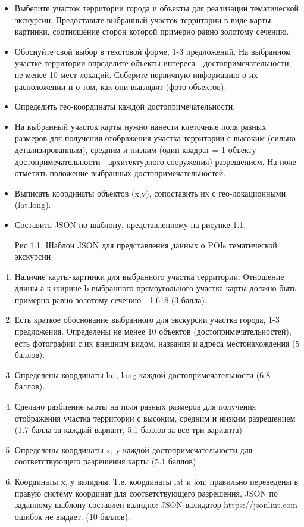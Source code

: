 
\begin{itemize} 
    \item Выберите участок территории города и объекты для реализации тематической экскурсии. Предоставьте выбранный участок территории в виде карты-картинки, соотношение сторон которой примерно равно золотому сечению. 
    \item Обоснуйте свой выбор в текстовой форме, 1-3 предложений. На выбранном участке территории определите объекты интереса - достопримечательности, не менее 10 мест-локаций. Соберите первичную информацию о их расположении и о том, как они выглядят (фото объектов).
    \item Определить гео-координаты каждой достопримечательности.
    \item На выбранный участок карты нужно нанести клеточные поля разных размеров для получения отображения участка территории с высоким (сильно детализированным), средним и низким (один квадрат = 1 объекту достопримечательности - архитектурного сооружения) разрешением. На поле отметить положение выбранных достопримечательностей. 
    \item Выписать координаты объектов  (x,y), сопоставить их с гео-локационными (lat,long). 
    \item Составить JSON по шаблону, представленному на рисунке 1.1.
    
    \begin{center}
        Рис.1.1. Шаблон JSON для представления данных о POIs тематической экскурсии
    \end{center}    
\end{itemize}

\markSection

\begin{enumerate}
    \item Наличие карты-картинки для выбранного участка территории. Отношение длины а к ширине  b выбранного прямоугольного участка карты должно быть примерно равно золотому сечению - 1.618  (3 балла).
    \item Есть краткое обоснование выбранного для экскурсии участка города, 1-3 предложения. Определены не менее 10 объектов (достопримечательностей), есть фотографии с их внешним видом, названия и адреса местонахождения (5 баллов). 
    \item Определены координаты lat, long каждой достопримечательности (6.8 баллов).
    \item Сделано разбиение карты на поля разных размеров для получения отображения участка территории с высоким, средним и низким разрешением (1.7 балла за каждый вариант, 5.1 баллов за все три варианта)
    \item Определены координаты x, y каждой достопримечательности для соответствующего разрешения карты (5.1 баллов)
    \item Координаты x, y валидны. Т.е. координаты lat и lon: правильно переведены в правую систему координат для соответствующего разрешения, JSON по заданному шаблону составлен валидно: JSON-валидатор \url{https://jsonlint.com} ошибок не выдает. (10 баллов).    
\end{enumerate}

